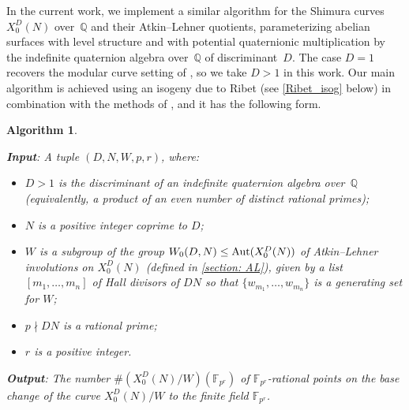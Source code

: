 \documentclass[11pt,reqno]{amsart}
\newcommand{\F}{\mathbb{F}}
\newcommand{\Q}{\mathbb{Q}}
\newcommand{\C}{\mathbb{C}}
\newcommand{\Aut}{{\rm Aut}}
\newtheorem{algorithm}[theorem]{Algorithm}
\theoremstyle{definition}
\newcommand{\Pietro}[1]{{\color{orange}{??Pietro: #1}}} %
\newcommand{\freddy}[1]{{\color{purple}{$\spadesuit$ Freddy: #1}}}
\begin{document}
In the current work, we implement a similar algorithm for the Shimura curves $X_0^D(N)$ over~$\Q$ and their Atkin--Lehner quotients, parameterizing abelian surfaces with level structure and with potential quaternionic multiplication by the indefinite quaternion algebra over~$\Q$ of discriminant~$D$. The case $D=1$ recovers the modular curve setting of \cite{DLMS}, so we take $D>1$ in this work. Our main algorithm is achieved using an isogeny due to Ribet (see \cref{Ribet_isog} below) in combination with the methods of \cite{DLMS}, and it has the following form.

\begin{algorithm}\label{algorithm: introduction_version}
\phantom{space} \vspace{0.5em}

\textnormal{\textbf{Input}}: A tuple $(D,N,W,p,r)$, where:
\begin{itemize}
    \item $D>1$ is the discriminant of an indefinite quaternion algebra over~$\Q$ (equivalently, a product of an even number of distinct rational primes);
    \item $N$ is a positive integer coprime to $D$;
    \item $W$ is a subgroup of the group $W_0(D,N) \leq \Aut(X_0^D(N))$ %
    of Atkin--Lehner involutions on $X_0^D(N)$ (defined in \cref{section: AL}), given by a list $[m_1, \ldots, m_n]$ of Hall divisors of $DN$ so that $\{w_{m_1}, \ldots, w_{m_n}\}$ is a generating set for $W$;
    \item $p \nmid DN$ is a rational prime;
    \item $r$ is a positive integer.
\end{itemize}

\textnormal{\textbf{Output}}: The number $\#\left(X_0^D(N)/W\right)\left(\F_{p^r}\right)$ of $\F_{p^r}$-rational points on the base change of the curve $X_0^D(N)/W$ to the finite field $\F_{p^r}$. 
\end{algorithm}
\end{document}
